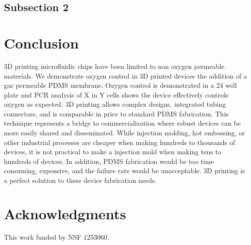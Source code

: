 \subsection*{Subsection 2}


\section*{Conclusion}
3D printing microfluidic chips have been limited to non oxygen permeable materials.
We demonstrate oxygen control in 3D printed devices the addition of a gas permeable PDMS membrane. 
Oxygen control is demonstrated in a 24 well plate and PCR analysis of X in Y cells shows the device effectively controls oxygen as expected.
3D printing allows complex designs, integrated tubing connectors, and is comparable in price to standard PDMS fabrication.
This technique represents a bridge to commercialization where robust devices can be more easily shared and disseminated.
While injection molding, hot embossing, or other industrial processes are cheaper when making hundreds to thousands of devices, it is not practical to make a injection mold when making tens to hundreds of devices.
In addition, PDMS fabrication would be too time consuming, expensive, and the failure rate would be unacceptable.
3D printing is a perfect solution to these device fabrication needs.



\section*{Acknowledgments}

This work funded by NSF 1253060.





%
%
% 

